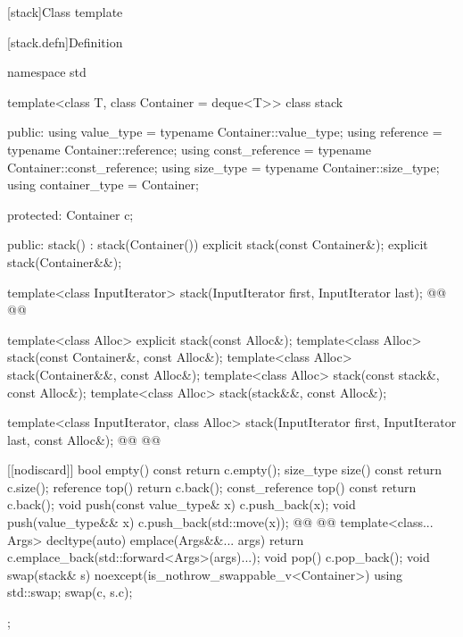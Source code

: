 \documentclass{wg21}
\begin{document}
[stack]{Class template }

[stack.defn]{Definition}

\begin{codeblock}
namespace std {
    template<class T, class Container = deque<T>>
    class stack {
        public:
        using value_type      = typename Container::value_type;
        using reference       = typename Container::reference;
        using const_reference = typename Container::const_reference;
        using size_type       = typename Container::size_type;
        using container_type  = Container;

        protected:
        Container c;

        public:
        stack() : stack(Container()) {}
        explicit stack(const Container&);
        explicit stack(Container&&);

        template<class InputIterator>
        stack(InputIterator first, InputIterator last);
        @@
        @@

        template<class Alloc> explicit stack(const Alloc&);
        template<class Alloc> stack(const Container&, const Alloc&);
        template<class Alloc> stack(Container&&, const Alloc&);
        template<class Alloc> stack(const stack&, const Alloc&);
        template<class Alloc> stack(stack&&, const Alloc&);


        template<class InputIterator, class Alloc>
        stack(InputIterator first, InputIterator last, const Alloc&);
        @@
        @@

        [[nodiscard]] bool empty() const    { return c.empty(); }
        size_type size()  const             { return c.size(); }
        reference         top()             { return c.back(); }
        const_reference   top() const       { return c.back(); }
        void push(const value_type& x)      { c.push_back(x); }
        void push(value_type&& x)           { c.push_back(std::move(x)); }
        @@
        @@
        template<class... Args>
        decltype(auto) emplace(Args&&... args)
        { return c.emplace_back(std::forward<Args>(args)...); }
        void pop()                          { c.pop_back(); }
        void swap(stack& s) noexcept(is_nothrow_swappable_v<Container>)
        { using std::swap; swap(c, s.c); }
    };

}
\end{codeblock}
\end{document}
